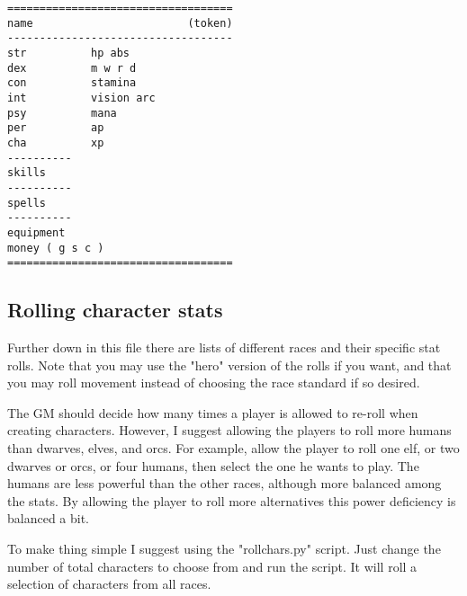 \goodbreak \begin{samepage} \begin{verbatim}
===================================
name                        (token)
-----------------------------------
str          hp abs
dex          m w r d
con          stamina
int          vision arc
psy          mana
per          ap
cha          xp
----------
skills
----------
spells
----------
equipment
money ( g s c )
===================================
\end{verbatim} \end{samepage}


\subsection*{Rolling character stats}
Further down in this file there are lists of different races and their specific stat rolls. Note that you may use the "hero" version of the rolls if you want, and that you may roll movement instead of choosing the race standard if so desired.

The GM should decide how many times a player is allowed to re-roll when creating characters. However, I suggest allowing the players to roll more humans than dwarves, elves, and orcs. For example, allow the player to roll one elf, or two dwarves or orcs, or four humans, then select the one he wants to play. The humans are less powerful than the other races, although more balanced among the stats. By allowing the player to roll more alternatives this power deficiency is balanced a bit.

To make thing simple I suggest using the "rollchars.py" script. Just change the number of total characters to choose from and run the script. It will roll a selection of characters from all races.




